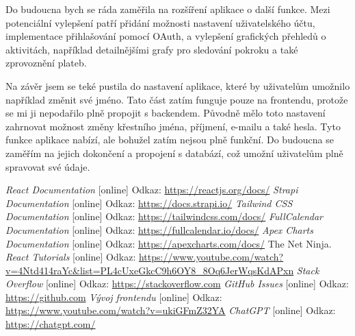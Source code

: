 \documentclass[12pt, a4paper,
twoside,        %
openany
]{report}
\begin{document}
Do budoucna bych se ráda zaměřila na rozšíření aplikace o další funkce. Mezi potenciální vylepšení patří přidání možnosti nastavení uživatelského účtu, implementace přihlašování pomocí OAuth, a vylepšení grafických přehledů o aktivitách, například detailnějšími grafy pro sledování pokroku a také zprovoznění plateb.

Na závěr jsem se teké pustila do nastavení aplikace, které by uživatelům umožnilo například změnit své jméno. Tato část zatím funguje pouze na frontendu, protože se mi ji nepodařilo plně propojit s backendem. Původně mělo toto nastavení zahrnovat možnost změny křestního jména, příjmení, e-mailu a také hesla. Tyto funkce aplikace nabízí, ale bohužel zatím nejsou plně funkční. Do budoucna se zaměřím na jejich dokončení a propojení s databází, což umožní uživatelům plně spravovat své údaje.

\renewcommand{\bibname}{SEZNAM POUŽITÝCH INFORMAČNÍCH ZDROJŮ}
\begin{thebibliography}{99}
  \textit{React Documentation} [online] Odkaz: \url{https://reactjs.org/docs/}
 \textit{Strapi Documentation} [online] Odkaz: \url{https://docs.strapi.io/}
 \textit{Tailwind CSS Documentation} [online] Odkaz: \url{https://tailwindcss.com/docs/}
 \textit{FullCalendar Documentation} [online] Odkaz: \url{https://fullcalendar.io/docs/}
 \textit{Apex Charts Documentation} [online] Odkaz: \url{https://apexcharts.com/docs/}
 The Net Ninja. \textit{React Tutorials} [online] Odkaz: \url{https://www.youtube.com/watch?v=4Ntd414raYc&list=PL4cUxeGkcC9h6OY8_8Oq6JerWqsKdAPxn}
 \textit{Stack Overflow} [online] Odkaz: \url{https://stackoverflow.com}
 \textit{GitHub Issues} [online] Odkaz: \url{https://github.com}
 \textit{Vývoj frontendu} [online] Odkaz: \url{https://www.youtube.com/watch?v=ukiGFmZ32YA}
 \textit{ChatGPT} [online] Odkaz: \url{https://chatgpt.com/}

\end{thebibliography}

	
	
\end{document}
